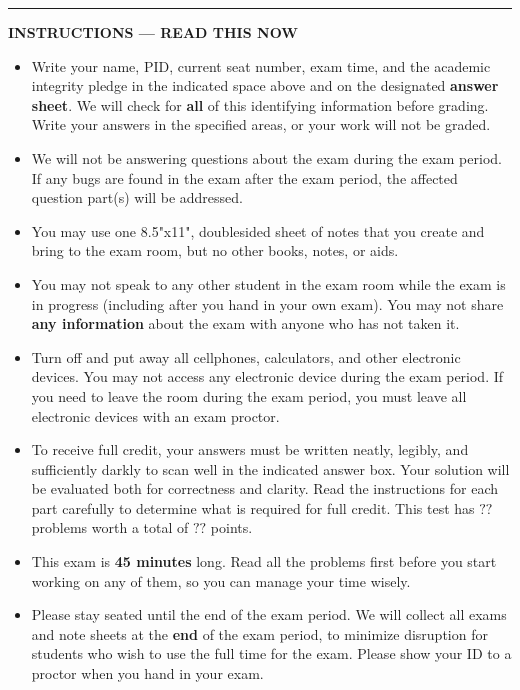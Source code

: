 \begin{center}
  \begin{minipage}[t]{7in}
  \rule{\linewidth}{2pt}
  \textbf{INSTRUCTIONS --- READ THIS NOW}
  \begin{itemize}
  
  \setlength{\itemsep}{0.025in}
  
  \item  Write your name, PID, current seat number, exam time, 
  and the academic integrity pledge in the indicated space above and 
  on the designated  {\bf answer sheet}.
  We will check for {\bf all} of this identifying information before grading.
  Write your answers in the specified areas, or your work will not be graded. 
  
  \item We will not be answering questions about the exam during the exam period. 
  If any bugs are found in the exam after the exam period, the affected question part(s) will be addressed.
  
  \item  You may use one 8.5"x11", doublesided sheet of notes that you create and bring to the exam room, but no other books, notes, or aids.
  
  \item You may not speak to any other student in the exam room while the exam 
  is in progress (including after you hand in your own exam).  You may not share
  {\bf any information} about the exam with anyone who has not taken it.
  
  \item Turn off and put away all cellphones, calculators, and other electronic devices.
  You may not access any electronic device during the exam period. If you need to leave 
  the room during the exam period, you must leave all electronic devices with an exam proctor.
  
  \item  To receive full credit, your answers must
  be written neatly, legibly, and sufficiently darkly to scan well in the indicated answer box. Your solution will be evaluated both for correctness and clarity.
  Read the instructions for each part carefully to determine what is required for full credit.
  This test has $??$ problems worth a total of $??$ points.
  
  \item This exam is {\bf 45 minutes} long. Read all the problems first before you start 
  working on any of them, so you can manage your time wisely.
  
  \item Please stay seated until the end of the exam period.
  We will collect all exams and note sheets at the {\bf end} of the exam period, to minimize disruption 
  for students who wish to use the full time for the exam. Please show your ID to a proctor when you hand 
  in your exam. 
  
  
  \end{itemize}
  \end{minipage} \hfill
  \end{center}
  \newpage
\fi

